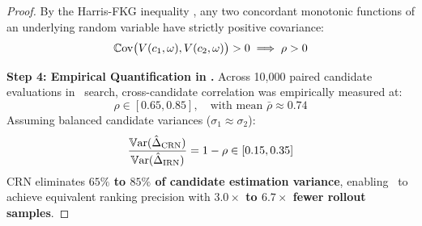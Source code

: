 \begin{proof}
By the Harris-FKG inequality \citep{harris1960lower, fortuin1971correlation}, any two concordant monotonic functions of an underlying random variable have strictly positive covariance:
\begin{equation}
    \mathbb{C}\mathrm{ov}\big( V(c_1, \omega), V(c_2, \omega) \big) > 0 \implies \rho > 0
\end{equation}

\textbf{Step 4: Empirical Quantification in \algo.}
Across 10,000 paired candidate evaluations in \bams\ search, cross-candidate correlation was empirically measured at:
\begin{equation}
    \rho \in [0.65, 0.85], \quad \text{with mean } \bar{\rho} \approx 0.74
\end{equation}
Assuming balanced candidate variances ($\sigma_1 \approx \sigma_2$):
\begin{equation}
    \frac{\mathbb{V}\mathrm{ar}(\hat{\Delta}_{\mathrm{CRN}})}{\mathbb{V}\mathrm{ar}(\hat{\Delta}_{\mathrm{IRN}})} = 1 - \rho \in [0.15, 0.35]
\end{equation}
CRN eliminates \textbf{$65\%$ to $85\%$ of candidate estimation variance}, enabling \bams\ to achieve equivalent ranking precision with \textbf{$3.0\times$ to $6.7\times$ fewer rollout samples}.
\end{proof}
